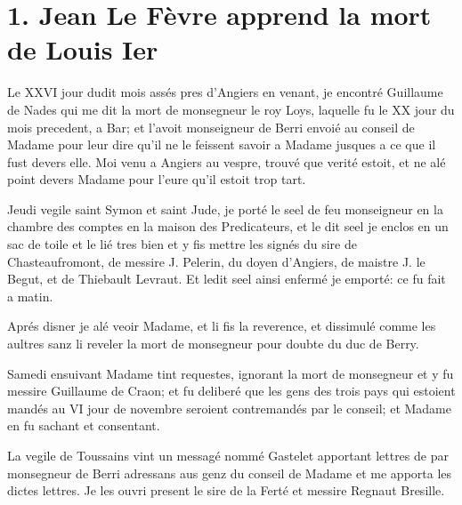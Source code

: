 \documentclass[]{book}
\begin{document}
        
            \chapter*{1. Jean Le Fèvre apprend la mort de Louis Ier}
            
            
            Le XXVI jour dudit mois assés pres d'Angiers en venant, je encontré Guillaume de Nades qui me dit la mort de monsegneur le roy Loys, laquelle fu le XX jour du mois precedent, a Bar; et l'avoit monseigneur de Berri envoié au conseil de Madame pour leur dire qu'il ne le feissent savoir a Madame jusques a ce que il fust devers elle. Moi venu a Angiers au vespre, trouvé que verité estoit, et ne alé point devers Madame pour l'eure qu'il estoit trop tart.
                    
                Jeudi vegile saint Symon et saint Jude, je porté le seel de feu monseigneur en la chambre des comptes en la maison des Predicateurs, et le dit seel je enclos en un sac de toile et le lié tres bien et y fis mettre les signés du sire de Chasteaufromont, de messire J. Pelerin, du doyen d'Angiers, de maistre J. le Begut, et de Thiebault Levraut. Et ledit seel ainsi enfermé je emporté: ce fu fait a matin.
                    
                Aprés disner je alé veoir Madame, et li fis la reverence, et dissimulé comme les aultres sanz li reveler la mort de monsegneur pour doubte du duc de Berry.
                    
                Samedi ensuivant Madame tint requestes, ignorant la mort de monsegneur et y fu messire Guillaume de Craon; et fu deliberé que les gens des trois pays qui estoient mandés au VI jour de novembre seroient contremandés par le conseil; et Madame en fu sachant et consentant.
                    
                La vegile de Toussains vint un messagé nommé Gastelet apportant lettres de par monsegneur de Berri adressans aus genz du conseil de Madame et me apporta les dictes lettres. Je les ouvri present le sire de la Ferté et messire Regnaut Bresille.
                    
\end{document}
